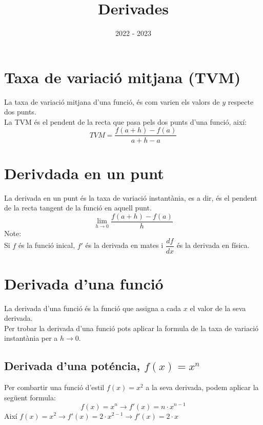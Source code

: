 \documentclass[12pt,a4paper]{article}
\title{Derivades}
\author{}
\date{2022 - 2023}
\begin{document}
\maketitle

\section{Taxa de variació mitjana (TVM)}

La taxa de variació mitjana d'una funció, és com varien els valors de $y$ respecte dos punts.\\
La TVM és el pendent de la recta que pasa pels dos punts d'una funció, així:
$$TVM=\dfrac{f(a+h)-f(a)}{a+h-a}$$

\section{Derivdada en un punt}
La derivada en un punt és la taxa de variació instantània, es a dir, és el pendent de la recta tangent de la funció en aquell punt.
$$\lim_{h\to0}\dfrac{f(a+h)-f(a)}{h}$$
Note:\\

Si $f$ és la funció inical, $f'$ és la derivada en mates i $\dfrac{df}{dx}$ és la derivada en física.
\section{Derivada d'una funció}
La derivada d'una funció és la funció que assigna a cada $x$ el valor de la seva derivada.\\
Per trobar la derivada d'una funció pots aplicar la formula de la taxa de variació instantània per a $h \to 0$.
\subsection{Derivada d'una poténcia, $f(x)=x^n$}
Per combartir una funció d'estil $f(x)=x^2$ a la seva derivada, podem aplicar la següent formula:
$$f(x)=x^n\rightarrow f'(x)=n\cdot x^{n-1}$$
Així $f(x)=x^2 \to f'(x)=2\cdot x^{2-1} \rightarrow f'(x)=2\cdot x$ 
\end{document}

